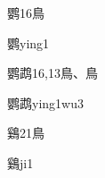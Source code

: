 \begin{Entry}{鹦}{16}{⿃}
  \begin{Phonetics}{鹦}{ying1}
  \end{Phonetics}
\end{Entry}

\begin{Entry}{鹦鹉}{16,13}{⿃、⿃}
  \begin{Phonetics}{鹦鹉}{ying1wu3}
  \end{Phonetics}
\end{Entry}

\begin{Entry}{鷄}{21}{⿃}
  \begin{Phonetics}{鷄}{ji1}
  \end{Phonetics}
\end{Entry}


